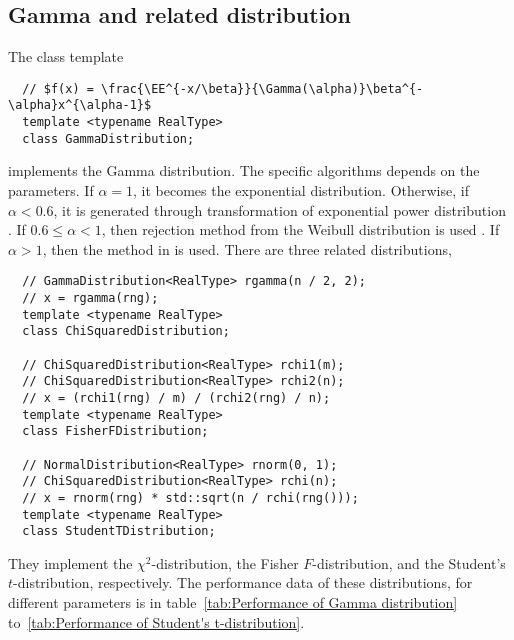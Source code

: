 \subsection{Gamma and related distribution}
\label{sub:Gamma and related distribution}

The class template
\begin{Verbatim}
  // $f(x) = \frac{\EE^{-x/\beta}}{\Gamma(\alpha)}\beta^{-\alpha}x^{\alpha-1}$
  template <typename RealType>
  class GammaDistribution;
\end{Verbatim}
implements the Gamma distribution. The specific algorithms depends on the
parameters. If $\alpha = 1$, it becomes the exponential distribution.
Otherwise, if $\alpha < 0.6$, it is generated through transformation of
exponential power distribution \parencite[sec~2.6]{Devroye:1986gi}. If
$0.6\le\alpha<1$, then rejection method from the Weibull distribution is used
\parencite[sec.~3.4]{Devroye:1986gi}. If $\alpha > 1$, then the method in
\textcite{Marsaglia:2000vq} is used. There are three related distributions,
\begin{Verbatim}
  // GammaDistribution<RealType> rgamma(n / 2, 2);
  // x = rgamma(rng);
  template <typename RealType>
  class ChiSquaredDistribution;

  // ChiSquaredDistribution<RealType> rchi1(m);
  // ChiSquaredDistribution<RealType> rchi2(n);
  // x = (rchi1(rng) / m) / (rchi2(rng) / n);
  template <typename RealType>
  class FisherFDistribution;

  // NormalDistribution<RealType> rnorm(0, 1);
  // ChiSquaredDistribution<RealType> rchi(n);
  // x = rnorm(rng) * std::sqrt(n / rchi(rng()));
  template <typename RealType>
  class StudentTDistribution;
\end{Verbatim}
They implement the $\chi^2$-distribution, the Fisher $F$-distribution, and the
Student's $t$-distribution, respectively. The performance data of these
distributions, for different parameters is in table~\ref{tab:Performance of
  Gamma distribution} to~\ref{tab:Performance of Student's t-distribution}.

\begin{table}
  \caption{Performance of Gamma distribution}
  \label{tab:Performance of Gamma distribution}
\end{table}

\begin{table}
  \caption{Performance of $\chi^2$ distribution}
  \label{tab:Performance of chi-squared distribution}
\end{table}

